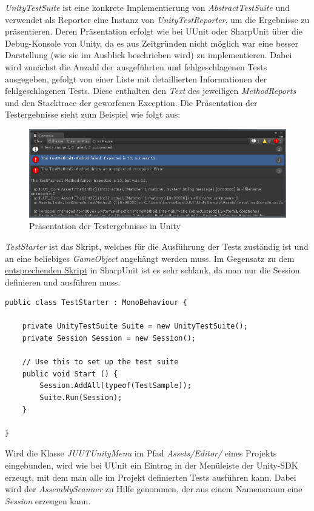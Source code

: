 \textit{UnityTestSuite} ist eine konkrete Implementierung von \textit{AbstractTestSuite} und verwendet als Reporter eine Instanz von \textit{UnityTestReporter}, um die Ergebnisse zu präsentieren. Deren Präsentation erfolgt wie bei UUnit oder SharpUnit über die Debug-Konsole von Unity, da es aus Zeitgründen nicht möglich war eine besser Darstellung (wie sie im Ausblick beschrieben wird) zu implementieren. Dabei wird zunächst die Anzahl der ausgeführten und fehlgeschlagenen Tests ausgegeben, gefolgt von einer Liste mit detaillierten Informationen der fehlgeschlagenen Tests. Diese enthalten den \textit{Text} des jeweiligen \textit{MethodReports} und den Stacktrace der geworfenen Exception. Die Präsentation der Testergebnisse sieht zum Beispiel wie folgt aus:
\begin{figure}[h]
\centering
\includegraphics[width=0.9\linewidth]{images/Kapitel_Ergebnis/JUUTTestergebnisse}
\caption[Präsentation der Testergebnisse in Unity]{Präsentation der Testergebnisse in Unity}
\label{fig:JUUTTestergebnisse}
\end{figure}

\textit{TestStarter} ist das Skript, welches für die Ausführung der Tests zuständig ist und an eine beliebiges \textit{GameObject} angehängt werden muss. Im Gegensatz zu dem \hyperref[code:SharpUnitTestRunner]{entsprechenden Skript} in SharpUnit ist es sehr schlank, da man nur die Session definieren und ausführen muss.\\

\begin{lstlisting}[caption={[\textit{TestStarter}-Skript von JUUT]\textit{TestStarter}-Skript von JUUT}, label=code:TestStarter_JUUT]
public class TestStarter : MonoBehaviour {

	private UnityTestSuite Suite = new UnityTestSuite();
	private Session Session = new Session();
	
	// Use this to set up the test suite
	public void Start () {
		Session.AddAll(typeof(TestSample));
		Suite.Run(Session);
	}
	
}
\end{lstlisting}

Wird die Klasse \textit{JUUTUnityMenu} im Pfad \textit{Assets/Editor/} eines Projekts eingebunden, wird wie bei UUnit ein Eintrag in der Menüleiste der Unity-SDK erzeugt, mit dem man alle im Projekt definierten Tests ausführen kann. Dabei wird der \textit{AssemblyScanner} zu Hilfe genommen, der aus einem Namensraum eine \textit{Session} erzeugen kann.